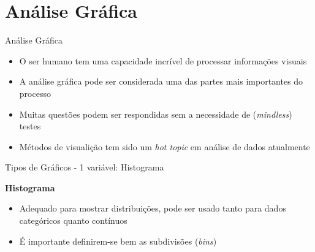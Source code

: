 \documentclass{beamer}\usepackage[]{graphicx}\usepackage[]{color}
\begin{document}
\section{Análise Gráfica}


\begin{frame}{Análise Gráfica}
  
\begin{itemize}

\item O ser humano tem uma capacidade incrível de processar informações visuais \pause
\vfill
\item	A análise gráfica pode ser considerada uma das partes mais importantes do processo \pause
\vfill
\item	Muitas questões podem ser respondidas sem a necessidade de (\emph{mindless}) testes  \pause
\vfill
\item  Métodos de visualição tem sido um \emph{hot topic} em análise de dados atualmente  

\end{itemize}


\end{frame} 


\begin{frame}{Tipos de Gráficos - 1 variável: Histograma}
  
\textbf{Histograma}  

\begin{itemize}
  \item Adequado para mostrar distribuições, pode ser usado tanto para dados categóricos quanto contínuos \pause
  \vfill
  \item  É importante definirem-se bem as subdivisões (\emph{bins})
\end{itemize}


\end{frame} 
\end{document}
